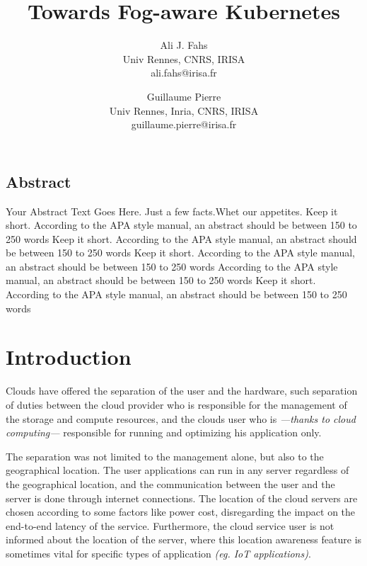 \documentclass[letterpaper,twocolumn,10pt]{article}
\begin{document}
\date{}
\title{\Large \bf Towards Fog-aware Kubernetes}
\author{
{\rm Ali J. Fahs}\\
Univ Rennes, CNRS, IRISA\\
ali.fahs@irisa.fr
\and
{\rm Guillaume Pierre}\\
Univ Rennes, Inria, CNRS, IRISA\\
guillaume.pierre@irisa.fr
}
\maketitle
\thispagestyle{empty}


\subsection*{Abstract}
Your Abstract Text Goes Here.  Just a few facts.Whet our appetites.
Keep it short. According to the APA style manual, an abstract should be between 150 to 250 words Keep it short. According to the APA style manual, an abstract should be between 150 to 250 words Keep it short. According to the APA style manual, an abstract should be between 150 to 250 words  According to the APA style manual, an abstract should be between 150 to 250 words Keep it short. According to the APA style manual, an abstract should be between 150 to 250 words 
\section{Introduction}
Clouds have offered the separation of the user and the hardware, such separation of duties between the cloud provider who is responsible for the management of the storage and compute resources, and the clouds user who is {\em ---thanks to cloud computing---} responsible for running and optimizing his application only.

The separation was not limited to the management alone, but also to the geographical location. The user applications can run in any server regardless of the geographical location, and the communication between the user and the server is done through internet connections. The location of the cloud servers are chosen according to some factors like power cost, disregarding the impact on the end-to-end latency of the service. Furthermore, the cloud service user is not informed about the location of the server, where this location awareness feature is sometimes vital for specific types of application {\em (eg. IoT applications)}.
\end{document}
